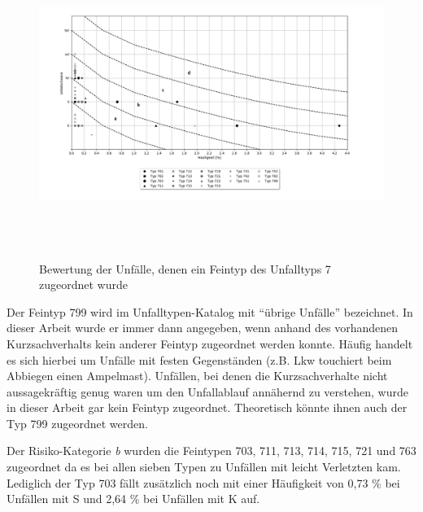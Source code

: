 \begin{savenotes}
	\begin{figure}[H]
		\centering
		\includegraphics[width=18cm,height=10cm]{figures/Bewertung_FT7}
		\caption[Bewertung der Unfälle, denen ein Feintyp des Unfalltyps 7 zugeordnet wurde]{Bewertung der Unfälle, denen ein Feintyp des Unfalltyps 7 zugeordnet wurde}\label{fig:Bewertung_FT7}
	\end{figure}
\end{savenotes}

Der Feintyp 799 wird im Unfalltypen-Katalog mit \enquote{übrige Unfälle} bezeichnet. In dieser Arbeit wurde er immer dann angegeben, wenn anhand des vorhandenen Kurzsachverhalts kein anderer Feintyp zugeordnet werden konnte. Häufig handelt es sich hierbei um Unfälle mit festen Gegenständen (z.B. Lkw touchiert beim Abbiegen einen Ampelmast). Unfällen, bei denen die Kurzsachverhalte nicht aussagekräftig genug waren um den Unfallablauf annähernd zu verstehen, wurde in dieser Arbeit gar kein Feintyp zugeordnet. Theoretisch könnte ihnen auch der Typ 799 zugeordnet werden.   

Der Risiko-Kategorie \textit{b} wurden die Feintypen 703, 711, 713, 714, 715, 721 und 763 zugeordnet da es bei allen sieben Typen zu Unfällen mit leicht Verletzten kam. Lediglich der Typ 703 fällt zusätzlich noch mit einer Häufigkeit von 0,73 \% bei Unfällen mit \ac{S} und 2,64 \% bei Unfällen mit \ac{K} auf.

